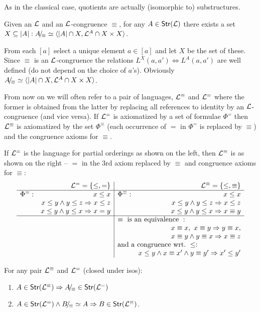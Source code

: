 \documentclass[12pt]{article}
\begin{document}
As in the classical case, quotients are actually (isomorphic to) substructures.
\begin{Fact}\label{fa:quotsub}
Given an ${{\cal{L}}}$ and an ${{\cal{L}}}$-congruence $\equiv$, for any $A\in{\sf {Str}}({{\cal{L}}})$
there exists a set
$X\subseteq|A|: A\!{\textstyle /}\!_{\equiv} \mathrel{\simeq}
\langle|A|\cap X, {{\cal{L}}}^A\cap X\times X\rangle$.
\end{Fact}
\begin{Proof}
From each $[a]$ select a unique element $a\in [a]$ and let $X$ be the set of
these. Since $\equiv$ is an ${{\cal{L}}}$-congruence the relations $L^X(a,a')\iff
L^A(a,a')$ are well defined (do not depend on the choice of $a$'s). Obviously
$A\!{\textstyle /}\!_{\equiv} \mathrel{\simeq} \langle|A|\cap X, {{\cal{L}}}^A\cap X\times X\rangle$.
\end{Proof}
%
From now on we will often refer to a pair of languages, ${{\cal{L}}}^\equiv$ and ${{\cal{L}}}^=$
where the former is obtained from the latter by replacing all references to
identity by an ${{\cal{L}}}$-congruence (and vice versa). If ${{\cal{L}}}^=$ is axiomatized
by a set of formulae $\Phi^=$ then ${{\cal{L}}}^\equiv$ is axiomatized by the set
$\Phi^\equiv$ (each occurrence of $=$ in $\Phi^=$ is replaced by $\equiv$) and
the congruence axioms for $\equiv$.
%
\begin{Example} If ${{\cal{L}}}^=$
is the language for partial orderings as shown on the left, then ${{\cal{L}}}^\equiv$ is
as shown on the right -- $=$ in the 3rd axiom replaced by $\equiv$ and
congruence axioms for $\equiv:$
\[\begin{array}{rr|rr}
& \lequ = \{\leq,=\} & & \lequiv = \{\leq,\equiv\} \\ \hline
\Phi^=:& x\leq x & \Phi^\equiv: &   x\leq x \\
& x\leq y \land y\leq z \impl x\leq z &&  x\leq y \land y\leq z \impl x\leq z \\
& x\leq y\land y\leq x\impl x=y && x\leq y\land y\leq x\impl x \equiv y \\ \cline{1-4}
&& \multicolumn{2}{l}{\equiv\ {\rm is\ an\ equivalence\ }:} \\ %
& && x\equiv x,\ x\equiv y \impl y\equiv x, \\
& &&  x\equiv y\land y\equiv x\impl x\equiv z \\ %
&& \multicolumn{2}{l}{{\rm and\ a\ congruence\ wrt.\ }\leq:} \\ %
& && x\leq y \land x\equiv x'\land y\equiv y'\impl x'\leq y'
\end{array}
\]
\end{Example}
%
\begin{Fact}\label{fa:then}
For any pair ${{\cal{L}}}^\equiv$ and ${{\cal{L}}}^=$ (closed under isos):
\begin{enumerate}\MyLPar
\item\label{it:quo} $A\in{\sf {Str}}({{\cal{L}}}^\equiv)\Rightarrow A\!{\textstyle /}\!_{\equiv}\in{\sf {Str}}({{\cal{L}}}^=)$
\item\label{it:pre} $A\in{\sf {Str}}({{\cal{L}}}^=) \land B\!{\textstyle /}\!_{\equiv} \mathrel{\simeq} A \Rightarrow B\in{\sf {Str}}({{\cal{L}}}^\equiv)$.
\end{enumerate}
\end{Fact}
\end{document}
